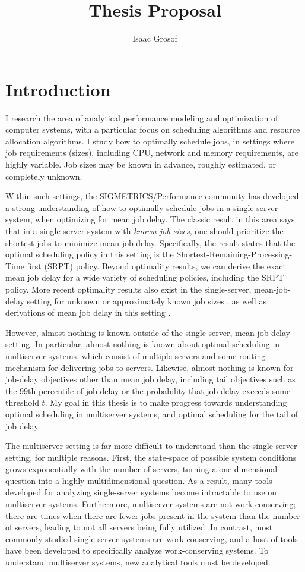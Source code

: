 \documentclass[11pt]{article}
\title{Thesis Proposal}
\author{Isaac Grosof}
\date{}
\begin{document}
\maketitle
\section{Introduction}
I research the area of analytical performance modeling and optimization of computer systems,
with a particular focus on scheduling algorithms and resource allocation algorithms.
I study how to optimally schedule jobs,
in settings where job requirements (sizes),
including CPU, network and memory requirements,
are highly variable.
Job sizes may be known in advance,
roughly estimated,
or completely unknown.

Within such settings,
the SIGMETRICS/Performance community has developed a strong understanding
of how to optimally schedule jobs in a single-server system,
when optimizing for mean job delay.
The classic result in this area \cite{doi:10.1287/opre.16.3.687}
says that in a single-server system with \textit{known job sizes},
one should prioritize the shortest jobs to minimize mean job delay.
Specifically, the result states that the optimal scheduling policy in this setting
is the Shortest-Remaining-Processing-Time first (SRPT) policy.
Beyond optimality results,
we can derive the exact mean job delay for a wide variety of scheduling policies,
including the SRPT policy.
More recent optimality results also exist in the single-server, mean-job-delay setting
for unknown or approximately known job sizes \cite{doi:10.1111/j.2517-6161.1979.tb01068.x},
as well as derivations of mean job delay in this setting \cite{Scully:2018:SOC:3203302.3179419}.

However, almost nothing is known outside of the single-server, mean-job-delay setting.
In particular, almost nothing is known about optimal scheduling in multiserver systems,
which consist of multiple servers and some routing mechanism for delivering jobs to servers.
Likewise, almost nothing is known for job-delay objectives other than mean job delay,
including tail objectives such as the 99th percentile of job delay
or the probability that job delay exceeds some threshold $t$.
My goal in this thesis is to make progress towards understanding optimal scheduling
in multiserver systems,
and optimal scheduling for the tail of job delay.

The multiserver setting is far more difficult to understand than the single-server setting,
for multiple reasons.
First, the state-space of possible system conditions grows exponentially
with the number of servers,
turning a one-dimensional question into a highly-multidimensional question.
As a result, many tools developed for analyzing single-server systems
become intractable to use on multiserver systems.
Furthermore, multiserver systems are not work-conserving;
there are times when there are fewer jobs present in the system than the number of servers,
leading to not all servers being fully utilized.
In contrast, most commonly studied single-server systems are work-conserving,
and a host of tools have been developed to specifically analyze work-conserving systems.
To understand multiserver systems, new analytical tools must be developed.
\end{document}
